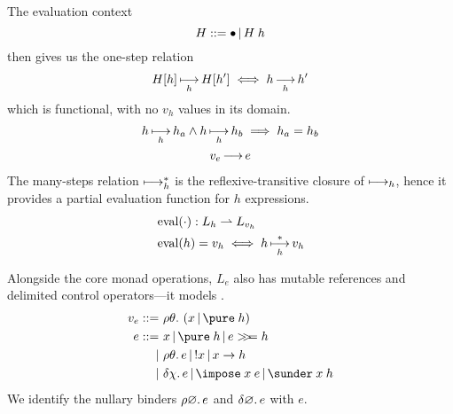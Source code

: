 \documentclass{report}
\begin{document}
The evaluation context \[
  H ::= \hole \| H \app h
\]
then gives us the one-step relation \[
  H[h] \operatorname*{\mathrel{\longmapsto}}_h H[h'] \iff h \operatorname*{\mathrel{\longrightarrow}}_h h'
\]
which is functional, with no \( v_h \) values in its domain.
\begin{gather*}
  h \operatorname*{\mathrel{\longmapsto}}_h h_a \wedge h \operatorname*{\mathrel{\longmapsto}}_h h_b \implies h_a = h_b \\
  v_e \operatorname*{\mathrel{\longrightarrow}} e
\end{gather*}
The many-steps relation \( \operatorname*{\mathrel{\longmapsto}}_h^* \) is the reflexive-transitive closure of \( \operatorname*{\mathrel{\longmapsto}}_h \), hence it provides a partial evaluation function for \( h \) expressions.
\begin{align*}
  &\operatorname*{\mathrm{eval}}(\cdot) : L_h \rightharpoonup L_{v_h} \\
  &\operatorname*{\mathrm{eval}}(h) = v_h \iff h \operatorname*{\mathrel{\longmapsto}}_h^* v_h
\end{align*}

Alongside the core monad operations, \( L_e \) also has mutable references and delimited control operators---it models \Cont.
\begin{align*}
  v_e ::= &\,\, \rh \theta {\left( x \| \pure \app h \right)} \\
  e   ::= &\,\, x
       \|       \pure \app h
       \|       e \bind h \\
       \| &\,\, \rh \theta e
       \|       \bang x
       \|       x \to h \\
       \| &\,\, \del \chi e
       \|       \impose \app x \app e
       \|       \sunder \app x \app h
\end{align*}
We identify the nullary binders \( \rho \varnothing . \, e \) and \( \delta \varnothing . \, e \) with \( e \).
\end{document}
